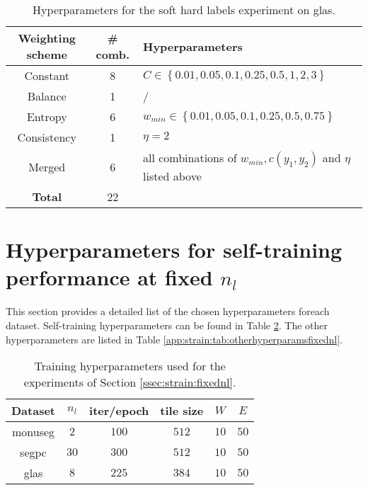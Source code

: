 \begin{table}
  \centering
  \begin{tabular}{|c|c|l|}
    \hline
    Weighting scheme & \# comb. & Hyperparameters \\
    \hline
    Constant & 8 & $C \in \left\{ 0.01, 0.05, 0.1, 0.25, 0.5, 1, 2, 3 \right\}$\\
    Balance & 1 &  / \\
    Entropy & 6 & $w_{min} \in \left\{ 0.01, 0.05, 0.1, 0.25, 0.5, 0.75 \right\}$\\
    Consistency & 1 & $\eta =2$\\
    Merged & 6 & all combinations of $w_{min}, c(y_1, y_2)$ and $\eta$ listed above\\
    \hline
    \textbf{Total} & 22 & \\
    \hline
  \end{tabular}
  \caption{Hyperparameters for the soft \vs hard labels experiment on \acrshort{glas}.}
  \label{app:strain:tab:hardvssoft_glas}
\end{table}

\section{Hyperparameters for self-training performance at fixed $n_l$}
\label{app:strain:sec:expfixednl}
This section provides a detailed list of the chosen hyperparameters foreach dataset. Self-training hyperparameters can be found in Table \ref{app:strain:tab:sthyperparamsfixednl}. The other hyperparameters are listed in Table \ref{app:strain:tab:otherhyperparamsfixednl}.

\begin{table}
    \centering
    \caption{Training hyperparameters used for the experiments of Section \ref{ssec:strain:fixednl}.}
    \begin{tabular}{|c|ccccc|}
        \hline
        Dataset & $n_l$ & iter/epoch & tile size & $W$ & $E$ \\
        \hline
        \acrshort{monuseg} & $2$ & $100$ & $512$ & $10$ & $50$ \\
        \acrshort{segpc} & $30$ & $300$ & $512$ & $10$ & $50$ \\
        \acrshort{glas} & $8$ & $225$ & $384$ & $10$ & $50$ \\
        \hline
    \end{tabular}
    \label{app:strain:tab:sthyperparamsfixednl}
\end{table}

